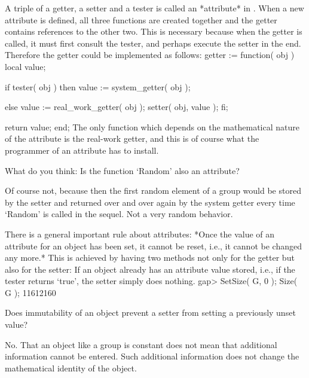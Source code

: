 A triple of a getter,  a setter and a tester  is called an *attribute* in
{\GAP}. When a new attribute is  defined, all three functions are created
together  and the getter contains  references to  the  other two. This is
necessary because when the  getter is called,  it must first consult  the
tester,  and perhaps execute the setter  in the end. Therefore the getter
could be implemented as follows:
\begintt
    getter := function( obj )
    local   value;

        if tester( obj )  then
            value := system_getter( obj );

        else
            value := real_work_getter( obj );
            setter( obj, value );
        fi;

        return value;
    end;
\endtt
The  only  function which depends  on  the   mathematical  nature of  the
attribute  is  the real-work  getter, and  this  is of   course  what the
programmer of an attribute has to install.

\exercise  What  do you think:  Is  the {\GAP} function  `Random' also an
attribute?

\answer Of course  not, because then the  first random element of a group
would be stored by  the setter and returned over  and  over again by  the
system getter every  time `Random' is  called in  the sequel.  Not a very
random behavior.

There is a general important rule about attributes: *Once the value of an
attribute for an object has been set, it cannot be reset, i.e., it cannot
be changed any more.* This is achieved by having two methods not only for
the getter but also for the setter: If an object already has an attribute
value stored, i.e., if the tester returns `true',  the setter simply does
nothing.
\beginexample
    gap> SetSize( G, 0 ); Size( G );
    11612160
\endexample

\exercise Does immutability of an object prevent a  setter from setting a
previously unset value?

\answer No. That  an object like a group  is constant does not mean  that
additional  information  cannot  be  entered. Such additional information
does not  change the mathematical  identity of  the object.

\null

